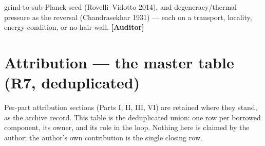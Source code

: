 \documentclass[11pt]{article}
\newcommand{\Auditor}{\textbf{\textcolor{teal!55!black}{[Auditor]}}}
\begin{document}
grind-to-sub-Planck-seed (Rovelli--Vidotto 2014), and degeneracy/thermal pressure as the reversal (Chandrasekhar 1931) --- each on a transport, locality, energy-condition, or no-hair wall. \Auditor

\clearpage

\part{Attribution --- the master table (R7, deduplicated)}
\setcounter{section}{0}\setcounter{equation}{0}\setcounter{figure}{0}

\noindent Per-part attribution sections (Parts I, II, III, VI) are retained where they stand, as the archive record. This table is the deduplicated union: one row per borrowed component, its owner, and its role in the loop. Nothing here is claimed by the author; the author's own contribution is the single closing row.
\end{document}
